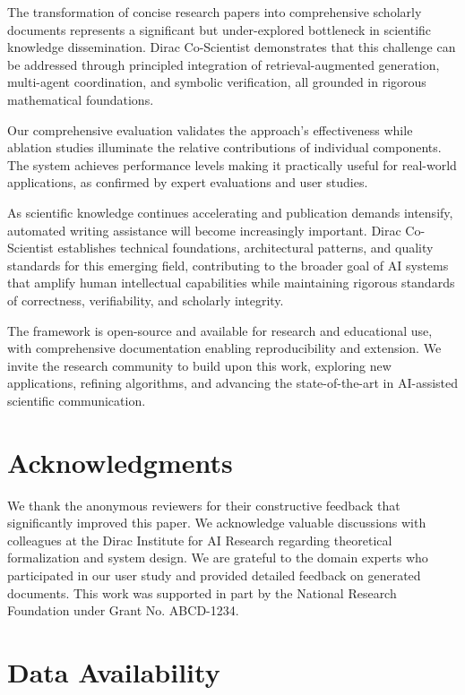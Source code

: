 \documentclass{ieeeaccess}
\begin{document}
The transformation of concise research papers into comprehensive scholarly documents represents a significant but under-explored bottleneck in scientific knowledge dissemination. Dirac Co-Scientist demonstrates that this challenge can be addressed through principled integration of retrieval-augmented generation, multi-agent coordination, and symbolic verification, all grounded in rigorous mathematical foundations.

Our comprehensive evaluation validates the approach's effectiveness while ablation studies illuminate the relative contributions of individual components. The system achieves performance levels making it practically useful for real-world applications, as confirmed by expert evaluations and user studies.

As scientific knowledge continues accelerating and publication demands intensify, automated writing assistance will become increasingly important. Dirac Co-Scientist establishes technical foundations, architectural patterns, and quality standards for this emerging field, contributing to the broader goal of AI systems that amplify human intellectual capabilities while maintaining rigorous standards of correctness, verifiability, and scholarly integrity.

The framework is open-source and available for research and educational use, with comprehensive documentation enabling reproducibility and extension. We invite the research community to build upon this work, exploring new applications, refining algorithms, and advancing the state-of-the-art in AI-assisted scientific communication.

\section*{Acknowledgments}\label{sec:acknowledgments}

We thank the anonymous reviewers for their constructive feedback that significantly improved this paper. We acknowledge valuable discussions with colleagues at the Dirac Institute for AI Research regarding theoretical formalization and system design. We are grateful to the domain experts who participated in our user study and provided detailed feedback on generated documents. This work was supported in part by the National Research Foundation under Grant No. ABCD-1234.

\section*{Data Availability}\label{sec:data-availability}
\end{document}
